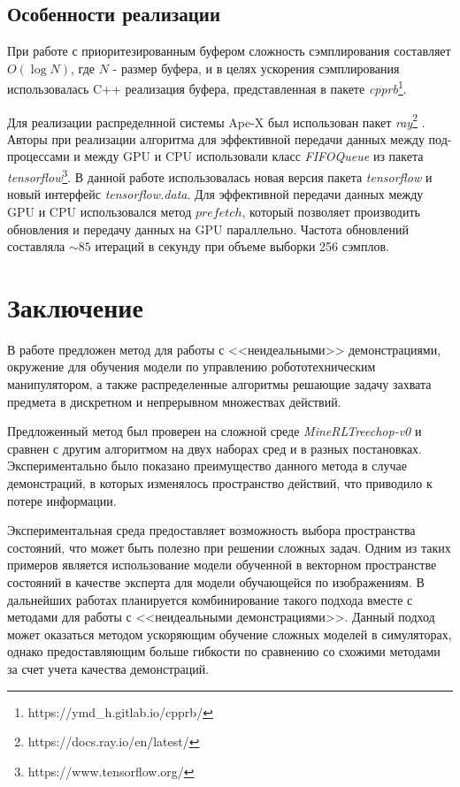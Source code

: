 \documentclass{mipt-thesis-bs}
\begin{document}
\section{Особенности реализации}

При работе с приоритезированным буфером сложность сэмплирования составляет $O(\operatorname{log}N)$, где $N$ - размер буфера, и в целях ускорения сэмплирования использовалась C++ реализация буфера, представленная в пакете \textit{cpprb}\footnote{https://ymd\_h.gitlab.io/cpprb/}.

Для реализации распределнной системы Ape-X \cite{apex} был использован пакет \textit{ray}\footnote{https://docs.ray.io/en/latest/} . Авторы \cite{apex} при реализации алгоритма для эффективной передачи данных между под-процессами и между GPU и CPU использовали класс \textit{FIFOQueue} из пакета \textit{tensorflow}\footnote{https://www.tensorflow.org/}. В данной работе использовалась новая версия пакета \textit{tensorflow} и новый интерфейс \textit{tensorflow.data}. Для эффективной передачи данных между GPU и CPU использовался метод $prefetch$, который позволяет производить обновления и передачу данных на GPU параллельно. Частота обновлений составляла $\sim85$ итераций в секунду при объеме выборки 256 сэмплов.

\backmatter

\chapter{Заключение}

В работе предложен метод для работы с <<неидеальными>> демонстрациями, окружение для обучения модели по управлению робототехническим манипулятором, а также распределенные алгоритмы решающие задачу захвата предмета в дискретном и непрерывном множествах действий. 

Предложенный метод был проверен на сложной среде \textit{MineRLTreechop-v0} и сравнен с другим алгоритмом на двух наборах сред и в разных постановках. Экспериментально было показано преимущество данного метода в случае демонстраций, в которых изменялось пространство действий, что приводило к потере информации.

Экспериментальная среда предоставляет возможность выбора пространства состояний, что может быть полезно при решении сложных задач. Одним из таких примеров является использование модели обученной в векторном пространстве состояний в качестве эксперта для модели обучающейся по изображениям. В дальнейших работах планируется комбинирование такого подхода вместе с методами для работы с <<неидеальными демонстрациями>>. Данный подход может оказаться методом ускоряющим обучение сложных моделей в симуляторах, однако предоставляющим больше гибкости по сравнению со схожими методами за счет учета качества демонстраций.  
\end{document}
